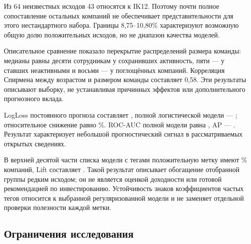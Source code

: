 Из 64 неизвестных исходов 43 относятся к IK12. Поэтому почти полное сопоставление остальных компаний не обеспечивает представительности для этого нестандартного набора. Границы 8,75--10,80\% характеризуют возможную общую долю положительных исходов, но не диапазон качества моделей.

Описательное сравнение показало перекрытие распределений размера команды: медианы равны десяти сотрудникам у сохранивших активность, пяти --- у ставших неактивными и восьми --- у поглощённых компаний. Корреляция Спирмена между возрастом и размером команды составляет 0,58. Эти результаты описывают выборку, не устанавливая причинных эффектов или дополнительного прогнозного вклада.

LogLoss постоянного прогноза составляет \resConstantLoss{}, полной логистической модели --- \resFullLoss{}; относительное снижение равно \resRelativeGain{}\%. ROC-AUC полной модели равна \resFullAUC{}, AP --- \resFullAP{}. Результат характеризует небольшой прогностический сигнал в рассматриваемых открытых сведениях.



В верхней десятой части списка модели с тегами положительную метку имеют \resTagsPrecisionPercent{}\% компаний, Lift составляет \resTagsLift{}. Такой результат описывает обогащение отобранной группы редким исходом; он не является оценкой доходности или готовой рекомендацией по инвестированию. Устойчивость знаков коэффициентов частых тегов относится к выбранной регуляризованной модели и не заменяет отдельной проверки полезности каждой метки.

\subsection{Ограничения исследования}

